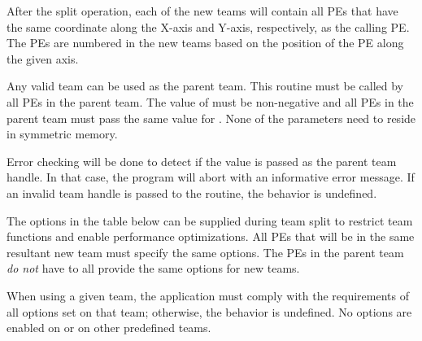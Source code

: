 \begin{apidefinition}
{After the split operation, each of the new teams will contain all \acp{PE} that
have the same coordinate along the X-axis and Y-axis, respectively, as the calling
\ac{PE}. The \acp{PE} are numbered in the new teams based on the position of the
\ac{PE} along the given axis.

Any valid \openshmem team can be used as the parent team. This routine must be
called by all \acp{PE} in the parent team. The value of  must be
non-negative and all \acp{PE} in the parent team must pass the same value for
. None of the parameters need to reside in symmetric memory.

Error checking will be done to detect if the value 
is passed as the parent team handle. In that case, the program will abort with
an informative error message. If an invalid team handle is passed to the
routine, the behavior is undefined.

The options in the table below can be supplied during team split to restrict
team functions and enable performance optimizations. All \acp{PE} that will
be in the same resultant new team must specify the same options. The \acp{PE}
in the parent team \emph{do not} have to all provide the same options for new
teams.

When using a given team, the application must comply with the requirements
of all options set on that team; otherwise, the behavior is undefined.
No options are enabled on  or on other
predefined \openshmem teams.

}


\end{apidefinition}
